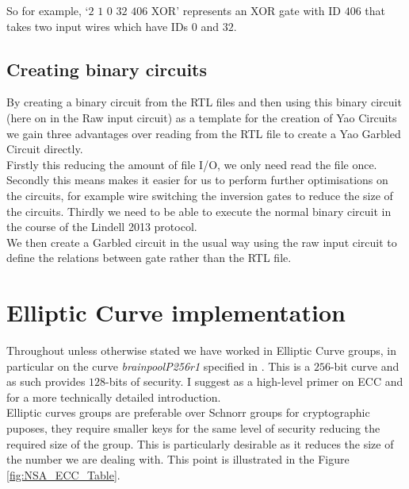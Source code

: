 \documentclass[ %
                    author={Nicholas Tutte},
                supervisor={Prof. Nigel Smart},
                    degree={MEng},
                     title={Secure Two Party Computation},
                  subtitle={A practical comparison of recent protocols},
                      type={Research - GG1K},
                      year={2015} ]{dissertation}
\begin{document}
				So for example, `$2$ $1$ $0$ $32$ $406$ XOR' represents an XOR gate with ID $406$ that takes two input wires which have IDs $0$ and $32$.

			\subsection{Creating binary circuits}
				By creating a binary circuit from the RTL files and then using this binary circuit (here on in the Raw input circuit) as a template for the creation of Yao Circuits we gain three advantages over reading from the RTL file to create a Yao Garbled Circuit directly.\\

				Firstly this reducing the amount of file I/O, we only need read the file once. Secondly this means makes it easier for us to perform further optimisations on the circuits, for example wire switching the inversion gates to reduce the size of the circuits. Thirdly we need to be able to execute the normal binary circuit in the course of the Lindell 2013 protocol.\\

				We then create a Garbled circuit in the usual way using the raw input circuit to define the relations between gate rather than the RTL file.

		\section{Elliptic Curve implementation}

			Throughout unless otherwise stated we have worked in Elliptic Curve groups, in particular on the curve \emph{brainpoolP256r1} specified in \cite{BrainpoolSpecifications}. This is a $256$-bit curve and as such provides $128$-bits of security. I suggest \cite{ECC_Primer} as a high-level primer on ECC and \cite{ECC_RFC_6090} for a more technically detailed introduction.\\

			Elliptic curves groups are preferable over Schnorr groups for cryptographic puposes, they require smaller keys for the same level of security reducing the required size of the group. This is particularly desirable as it reduces the size of the number we are dealing with. This point is illustrated in the Figure \ref{fig:NSA_ECC_Table}.\\
\end{document}
